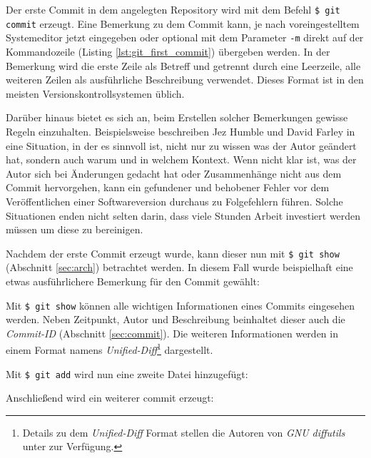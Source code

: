 Der erste Commit in dem angelegten Repository wird mit dem Befehl \texttt{\$
git commit} erzeugt. Eine Bemerkung zu dem Commit kann, je nach
voreingestelltem Systemeditor jetzt eingegeben oder optional mit dem Parameter
\texttt{-m} direkt auf der Kommandozeile (Listing \ref{lst:git_first_commit})
übergeben werden. In der Bemerkung wird die erste Zeile als Betreff und
getrennt durch eine Leerzeile, alle weiteren Zeilen als ausführliche
Beschreibung verwendet. Dieses Format ist in den meisten
Versionskontrollsystemen üblich.


Darüber hinaus bietet es sich an, beim Erstellen solcher Bemerkungen gewisse
Regeln einzuhalten. Beispielsweise beschreiben Jez Humble und David Farley in
\cite[S.~37]{cd} eine Situation, in der es sinnvoll ist, nicht nur zu wissen
was der Autor geändert hat, sondern auch warum und in welchem Kontext. Wenn
nicht klar ist, was der Autor sich bei Änderungen gedacht hat oder
Zusammenhänge nicht aus dem Commit hervorgehen, kann ein gefundener und
behobener Fehler vor dem Veröffentlichen einer Softwareversion durchaus zu
Folgefehlern führen. Solche Situationen enden nicht selten darin, dass viele
Stunden Arbeit investiert werden müssen um diese zu bereinigen.
\cite[S.~37]{cd}

Nachdem der erste Commit erzeugt wurde, kann dieser nun mit \texttt{\$ git
show} (Abschnitt \ref{sec:arch}) betrachtet werden. In diesem Fall wurde
beispielhaft eine etwas ausführlichere Bemerkung für den Commit gewählt:


Mit \texttt{\$ git show} können alle wichtigen Informationen eines Commits
eingesehen werden. Neben Zeitpunkt, Autor und Beschreibung beinhaltet dieser
auch die \textit{Commit-ID} (Abschnitt \ref{sec:commit}). Die weiteren
Informationen werden in einem Format namens
\textit{Unified-Diff}\footnote{Details zu dem \textit{Unified-Diff} Format
stellen die Autoren von \textit{GNU diffutils} unter
\cite[S.~12-13]{paper:diffutils} zur Verfügung.} dargestellt. \cite[25]{gitosp}

Mit \texttt{\$ git add} wird nun eine zweite Datei hinzugefügt:


Anschließend wird ein weiterer \gls{commit} erzeugt:

